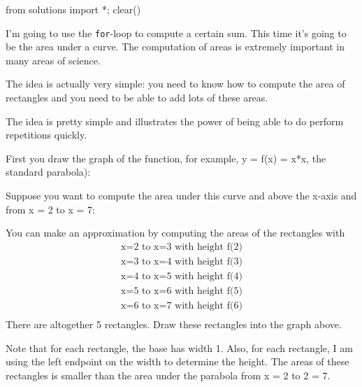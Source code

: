 \begin{python0}
from solutions import *; clear()
\end{python0}

I'm going to use the \texttt{for}-loop to compute a certain sum.
This time it's going to be the area under a curve. The computation of areas is extremely important in many areas of science.

The idea is actually very simple: you need to know how to compute the area of rectangles and you need to be able to add lots of these areas.

The idea is pretty simple and illustrates the power of being able to do perform repetitions quickly.

First you draw the graph of the function, for example, y = f(x) = x*x, the standard parabola):


Suppose you want to compute the area under this curve and above the
x-axis and from x = 2 to x = 7:


You can make an approximation by computing the areas of the rectangles
with
\begin{align*}
\text{x=2 to x=3 with height f(2)}\\
\text{x=3 to x=4 with height f(3)}\\
\text{x=4 to x=5 with height f(4)}\\
\text{x=5 to x=6 with height f(5)}\\
\text{x=6 to x=7 with height f(6)}\\
\end{align*}
There are altogether 5 rectangles. Draw these rectangles into the graph
above.


Note that for each rectangle, the base has width 1. Also, for each
rectangle, I am using the left endpoint on the width to determine the
height. The areas of these rectangles is smaller than the area under the
parabola from x = 2 to 2 = 7.

